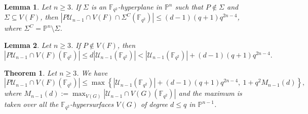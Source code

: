 \documentclass[10pt,a4paper]{amsart}
\newtheorem{lemma}{Lemma}
\newtheorem{theorem}{Theorem}
\newcommand{\Fqt}{\mathbb{F}_{q^2}}
\def\PP{{\mathbb P}}
\newcommand{\U}{\mathcal{U}}
\begin{document}
\begin{lemma}\label{outside hyperplane}
 Let $n\geq 3$. If $\Sigma$ is an $\Fqt$-hyperplane in $\PP^n$  such that $P \not\in \Sigma$ and $\Sigma \subseteq  V(F)$, then $|P\U_{n-1} \cap V(F)\cap \Sigma^C(\Fqt)| \le (d-1)(q+1)q^{2n-4}$, where $\Sigma^C = \PP^n \setminus \Sigma$. 
\end{lemma}

\begin{lemma}\label{missing P}
  Let $n\geq 3$. If $P\notin V(F)$, then $$|P\U_{n-1}\cap V(F)(\Fqt)|\leq d|\U_{n-1}(\Fqt)|< |\U_{n-1}(\Fqt)|+(d-1)(q+1)q^{2n-4}.$$   
\end{lemma}

\begin{theorem}\label{rank n}
  Let $n\geq 3$. We have $$|P\U_{n-1}\cap V(F)(\Fqt)|\leq \max \left\{|\U_{n-1}(\Fqt)|+(d-1)(q+1)q^{2n-4}, \ 1+q^2 M_{n-1}(d) \right\},$$ where $M_{n-1}(d):= \max_{V(G)}|\U_{n-1}\cap V(G)(\Fqt)|$ and the maximum is taken over all the $\Fqt$-hypersurfaces $V(G)$ of degree $d\leq q$ in $\PP^{n-1}$.   
\end{theorem}
\end{document}
